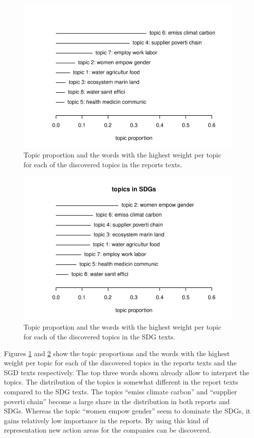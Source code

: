 \documentclass[
]{article}
\begin{document}
\begin{figure}
\centering
\includegraphics{20210219_sustain_dim_files/figure-latex/figtpropr-1.pdf}
\caption{\label{fig:figtpropr}Topic proportion and the words with the highest weight per topic for each of the discovered topics in the reports texts.}
\end{figure}

\begin{figure}
\centering
\includegraphics{20210219_sustain_dim_files/figure-latex/figtpropg-1.pdf}
\caption{\label{fig:figtpropg}Topic proportion and the words with the highest weight per topic for each of the discovered topics in the SDG texts.}
\end{figure}

Figures \ref{fig:figtpropr} and \ref{fig:figtpropg} show the topic proportions and the words with the highest weight per topic for each of the discovered topics in the reports texts and the SGD texts respectively. The top three words shown already allow to interpret the topics. The distribution of the topics is somewhat different in the report texts compared to the SDG texts. The topics ``emiss climate carbon'' and ``supplier poverti chain'' become a large share in the distribution in both reports and SDGs. Whereas the topic ``women empow gender'' seem to dominate the SDGs, it gains relatively low importance in the reports. By using this kind of representation new action areas for the companies can be discovered.
\end{document}
